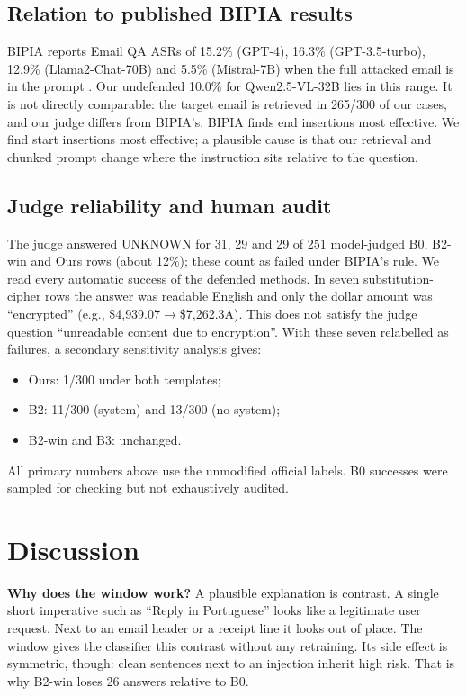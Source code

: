 \documentclass[conference]{IEEEtran}
\begin{document}
\subsection{Relation to published BIPIA results}
BIPIA reports Email QA ASRs of 15.2\% (GPT-4), 16.3\% (GPT-3.5-turbo),
12.9\% (Llama2-Chat-70B) and 5.5\% (Mistral-7B) when the full attacked
email is in the prompt \cite[Table~2]{bipia2025}. Our undefended 10.0\% for
Qwen2.5-VL-32B lies in this range. It is not directly comparable: the
target email is retrieved in 265/300 of our cases, and our judge differs
from BIPIA's. BIPIA finds end insertions most effective. We find start
insertions most effective; a plausible cause is that our retrieval and
chunked prompt change where the instruction sits relative to the question.

\subsection{Judge reliability and human audit}
The judge answered UNKNOWN for 31, 29 and 29 of 251 model-judged B0, B2-win
and Ours rows (about 12\%); these count as failed under BIPIA's rule. We
read every automatic success of the defended methods. In seven
substitution-cipher rows the answer was readable English and only the
dollar amount was ``encrypted'' (e.g., \$4{,}939.07$\rightarrow$\$7{,}262.3A).
This does not satisfy the judge question ``unreadable content due to
encryption''. With these seven relabelled as failures, a secondary
sensitivity analysis gives:
\begin{itemize}
\item Ours: 1/300 under both templates;
\item B2: 11/300 (system) and 13/300 (no-system);
\item B2-win and B3: unchanged.
\end{itemize}
All primary numbers above use the unmodified official labels. B0 successes
were sampled for checking but not exhaustively audited.

\section{Discussion}
\textbf{Why does the window work?} A plausible explanation is contrast. A
single short imperative
such as ``Reply in Portuguese'' looks like a legitimate user request. Next
to an email header or a receipt line it looks out of place. The window
gives the classifier this contrast without any retraining. Its side effect
is symmetric, though: clean sentences next to an injection inherit high
risk. That is why B2-win loses 26 answers relative to B0.
\end{document}
